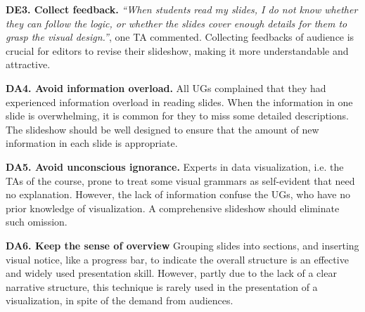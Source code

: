 \textbf{DE3. Collect feedback.} \textit{``When students read my slides, I do not know whether they can follow the logic, or whether the slides cover enough details for them to grasp the visual design.''}, one TA commented. 
Collecting feedbacks of audience is crucial for editors to revise their slideshow, making it more understandable and attractive.  


\textbf{DA4. Avoid information overload.} 
All UGs complained that they had experienced information overload in reading slides. 
When the information in one slide is overwhelming, it is common for they to miss some detailed descriptions. 
The slideshow should be well designed to ensure that the amount of new information in each slide is appropriate. 

\textbf{DA5. Avoid unconscious ignorance.}
Experts in data visualization, i.e. the TAs of the course, prone to treat some visual grammars as self-evident that need no  explanation. However, the lack of information confuse the UGs, who have no prior knowledge of visualization. A comprehensive slideshow should eliminate such omission. 

\textbf{DA6. Keep the sense of overview}
Grouping slides into sections, and inserting visual notice, like a progress bar, to indicate the overall structure is an effective and widely used presentation skill. However, partly due to the lack of a clear narrative structure, this technique is rarely used in the presentation of a visualization, in spite of the demand from audiences. 


